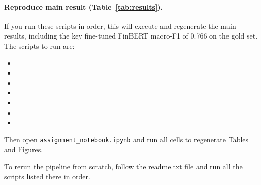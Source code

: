 \documentclass[11pt]{article}
\begin{document}
\paragraph{Reproduce main result (Table~\ref{tab:results}).}
If you run these scripts in order, this will execute and regenerate the main results, including the key fine-tuned FinBERT macro-F1 of 0.766 on the gold set. The scripts to run are:
\begin{itemize}
  \item {}
  \item {}
  \item {}
  \item {}
  \item {}
  \item {}
  \item {}
\end{itemize}
Then open \texttt{assignment\_notebook.ipynb} and run all cells to regenerate
Tables and Figures. \newline

To rerun the pipeline from scratch, follow the readme.txt file and run all the scripts listed there in order.
\end{document}
